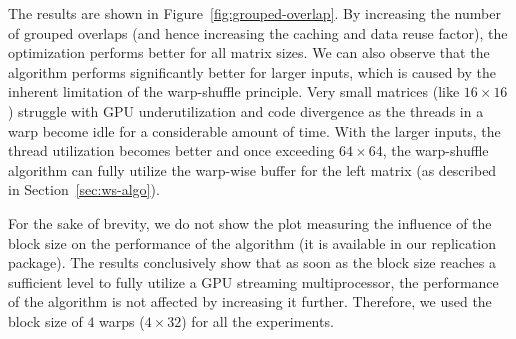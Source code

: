 The results are shown in Figure~\ref{fig:grouped-overlap}. By increasing the number of grouped overlaps (and hence increasing the caching and data reuse factor), the optimization performs better for all matrix sizes. We can also observe that the algorithm performs significantly better for larger inputs, which is caused by the inherent limitation of the warp-shuffle principle. Very small matrices (like $16\times 16$) struggle with GPU underutilization and code divergence as the threads in a warp become idle for a considerable amount of time. With the larger inputs, the thread utilization becomes better and once exceeding $64\times 64$, the warp-shuffle algorithm can fully utilize the warp-wise buffer for the left matrix (as described in Section~\ref{sec:ws-algo}).




For the sake of brevity, we do not show the plot measuring the influence of the block size on the performance of the algorithm (it is available in our replication package). The results conclusively show that as soon as the block size reaches a sufficient level to fully utilize a GPU streaming multiprocessor, the performance of the algorithm is not affected by increasing it further. Therefore, we used the block size of $4$ warps ($4\times 32$) for all the experiments.

